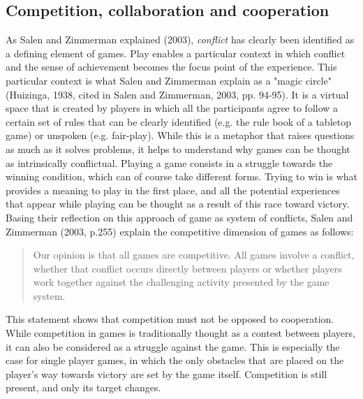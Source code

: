 \subsection{Competition, collaboration and cooperation}
As Salen and Zimmerman explained (2003)\cite{book:rop}, \textit{conflict} has clearly been identified as a defining element of games. Play enables a particular context in which conflict and the sense of achievement becomes the focus point of the experience. This particular context is what Salen and Zimmerman explain as a "magic circle" (Huizinga, 1938, cited in Salen and Zimmerman, 2003, pp. 94-95)\cite{book:rop}. It is a virtual space that is created by players in which all the participants agree to follow a certain set of rules that can be clearly identified (e.g. the rule book of a tabletop game) or unspoken (e.g. fair-play). While this is a metaphor that raises questions as much as it solves problems, it helps to understand why games can be thought as intrinsically conflictual. 
Playing a game consists in a struggle towards the winning condition, which can of course take different forms. Trying to win is what provides a meaning to play in the first place, and all the potential experiences that appear while playing can be thought as a result of this race toward victory. Basing their reflection on this approach of game as system of conflicts, Salen and Zimmerman (2003, p.255)\cite{book:rop} explain the competitive dimension of games as follows:

\begin{quotation}
Our opinion is that all games are competitive. All games involve a conflict, whether that conflict occurs directly between players or whether players work together against the challenging activity presented by the game system.
\end{quotation}

This statement shows that competition must not be opposed to cooperation. While competition in games is traditionally  thought as a contest between players, it can also be considered as a struggle against the game. This is especially the case for single player games, in which the only obstacles that are placed on the player's way towards victory are set by the game itself. Competition is still present, and only its target changes. 

